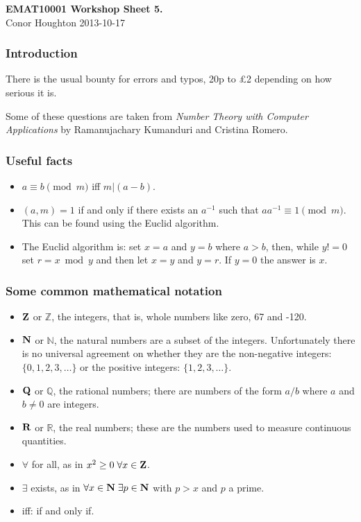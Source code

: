 \documentclass[12pt]{article}
\begin{document}
\begin{center}
{\bf EMAT10001 Workshop Sheet 5.}\\[1cm]{} Conor Houghton 2013-10-17
\end{center}
\subsubsection*{Introduction} 
There is the usual bounty for errors and typos, 20p to \pounds 2
depending on how serious it is.

Some of these questions are taken from \emph{Number Theory with
  Computer Applications} by Ramanujachary Kumanduri and Cristina
Romero.

\subsubsection*{Useful facts}
\begin{itemize}
\item $a\equiv b \pmod m$ iff $m|(a-b)$.
\item $(a,m)=1$ if and only if there exists an $a^{-1}$ such that $aa^{-1}\equiv 1 \pmod m$. This can be found using the Euclid algorithm.
\item The Euclid algorithm is: set $x=a$ and $y=b$ where $a>b$, then, while $y!=0$
  set $r=x\bmod y$ and then let $x=y$ and $y=r$. If $y=0$ the answer
  is $x$.
\end{itemize}
\subsubsection*{Some common mathematical notation}
\begin{itemize}
\item ${\bf Z}$ or $\mathbb{Z}$, the integers, that is, whole numbers like zero, 67 and -120.
\item ${\bf N}$ or $\mathbb{N}$, the natural numbers are a subset of
  the integers. Unfortunately there is no universal agreement on
  whether they are the non-negative integers: $\{0,1,2,3,\ldots\}$ or
  the positive integers: $\{1,2,3,\ldots\}$.
\item ${\bf Q}$ or $\mathbb{Q}$, the rational numbers; there are numbers of the form $a/b$ where $a$ and $b\not=0$ are integers.
\item ${\bf R}$ or $\mathbb{R}$, the real numbers; these are the numbers used to measure continuous quantities.
\item $\forall$ for all, as in $x^2\ge 0\;\forall x\in {\bf Z}$.
\item $\exists$ exists, as in $\forall x\in {\bf N}\;\exists p\in {\bf N}$ with $p>x$ and $p$ a prime.
\item iff: if and only if. 
\end{itemize}
\end{document}
